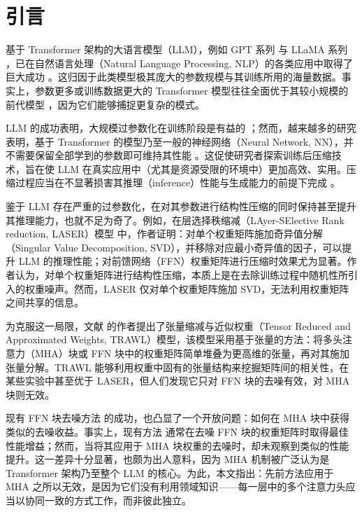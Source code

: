 
\section{引言}
基于 Transformer 架构的大语言模型（LLM），例如 GPT 系列 \cite{ brown2020language, achiam2023gpt} 与 LLaMA 系列 \cite{touvron2023LLaMA, llama2, dubey2024LLaMA}，已在自然语言处理（Natural Language Processing, NLP）的各类应用中取得了巨大成功 \cite{wang-etal-2019-learning-deep, irie19b_interspeech, liu2019text}。这归因于此类模型极其庞大的参数规模与其训练所用的海量数据。事实上，参数更多或训练数据更大的 Transformer 模型往往全面优于其较小规模的前代模型 \cite{brown2020language,touvron2023LLaMA}，因为它们能够捕捉更复杂的模式。\par
LLM 的成功表明，大规模过参数化在训练阶段是有益的 \cite{overparam}；然而，越来越多的研究表明，基于 Transformer 的模型乃至一般的神经网络（Neural Network, NN），并不需要保留全部学到的参数即可维持其性能 \cite{sajjad2023effect, Fan2020Reducing}。这促使研究者探索训练后压缩技术，旨在使 LLM 在真实应用中（尤其是资源受限的环境中）更加高效、实用。压缩过程应当在不显著损害其推理（inference）性能与生成能力的前提下完成 \cite{sharma2023truth,eff_inference_3, calvi2019compression, xu2023tensorgpt}。\par
鉴于 LLM 存在严重的过参数化，在对其参数进行结构性压缩的同时保持甚至提升其推理能力，也就不足为奇了。例如，在层选择秩缩减（LAyer-SElective Rank reduction, LASER）模型 \cite{sharma2023truth} 中，作者证明：对单个权重矩阵施加奇异值分解（Singular Value Decomposition, SVD），并移除对应最小奇异值的因子，可以提升 LLM 的推理性能；对前馈网络（FFN）权重矩阵进行压缩时效果尤为显著。作者认为，对单个权重矩阵进行结构性压缩，本质上是在去除训练过程中随机性所引入的权重噪声。然而，LASER 仅对单个权重矩阵施加 SVD，无法利用权重矩阵之间共享的信息。\par
为克服这一局限，文献 \cite{luo2024trawl} 的作者提出了张量缩减与近似权重（Tensor Reduced and Approximated Weights, TRAWL）模型，该模型采用基于张量的方法：将多头注意力（MHA）块或 FFN 块中的权重矩阵简单堆叠为更高维的张量，再对其施加张量分解。TRAWL 能够利用权重中固有的张量结构来挖掘矩阵间的相关性，在某些实验中甚至优于 LASER，但人们发现它只对 FFN 块的去噪有效，对 MHA 块则无效。\par

现有 FFN 块去噪方法 \cite{sharma2023truth, luo2024trawl} 的成功，也凸显了一个开放问题：如何在 MHA 块中获得类似的去噪收益。事实上，现有方法 \cite{sharma2023truth, luo2024trawl} 通常在去噪 FFN 块的权重矩阵时取得最佳性能增益；然而，当将其应用于 MHA 块权重的去噪时，却未观察到类似的性能提升。这一差异十分显著，也颇为出人意料，因为 MHA 机制被广泛认为是 Transformer 架构乃至整个 LLM 的核心。为此，本文指出：先前方法应用于 MHA 之所以无效，是因为它们没有利用领域知识——每一层中的多个注意力头应当以协同一致的方式工作，而非彼此独立。

